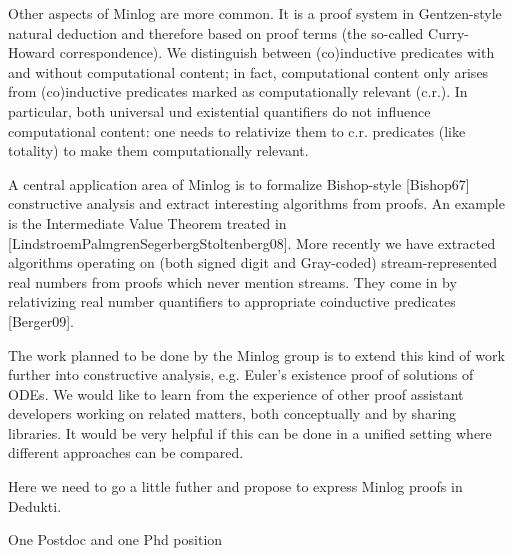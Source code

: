 Other aspects of Minlog are more common.  It is a proof system in
Gentzen-style natural deduction and therefore based on proof terms
(the so-called Curry-Howard correspondence).  We distinguish between
(co)inductive predicates with and without computational content; in
fact, computational content only arises from (co)inductive predicates
marked as computationally relevant (c.r.).  In particular, both
universal und existential quantifiers do not influence computational
content: one needs to relativize them to c.r. predicates (like
totality) to make them computationally relevant.

A central application area of Minlog is to formalize Bishop-style
[Bishop67] constructive analysis and extract interesting algorithms
from proofs. An example is the Intermediate Value Theorem treated in
[LindstroemPalmgrenSegerbergStoltenberg08].  More recently we have
extracted algorithms operating on (both signed digit and Gray-coded)
stream-represented real numbers from proofs which never mention
streams.  They come in by relativizing real number quantifiers to
appropriate coinductive predicates [Berger09].

The work planned to be done by the Minlog group is to extend this kind
of work further into constructive analysis, e.g. Euler's existence
proof of solutions of ODEs.  We would like to learn from the
experience of other proof assistant developers working on related
matters, both conceptually and by sharing libraries.  It would be very
helpful if this can be done in a unified setting where different
approaches can be compared.

Here we need to go a little futher and propose to express Minlog
proofs in Dedukti.

One Postdoc and one Phd position
